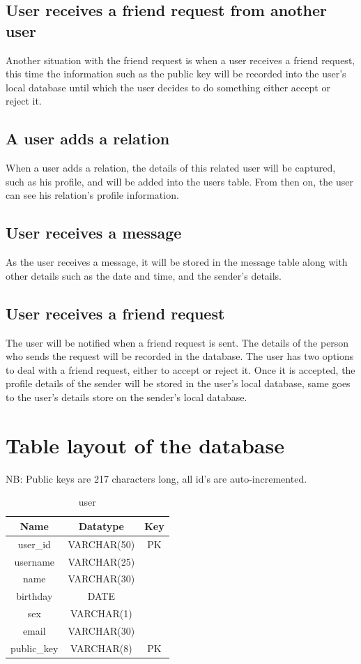 \subsection{User receives a friend request from another user}
Another situation with the friend request is when a user receives a friend 
request, this time the information such as the public key will be recorded 
into the user's local database until which the user decides to do something 
either accept or reject it.

\subsection{A user adds a relation}
When a user adds a relation, the details of this related user will be captured, 
such as his profile, and will be added into the users table. From then on, the 
user can see his relation's profile information. 

\subsection{User receives a message} 
As the user receives a message, it will be stored in the message table along 
with other details such as the date and time, and the sender's details.

\subsection{User receives a friend request}
The user will be notified when a friend request is sent. The details of the 
person who sends the request will be recorded in the database. The user has 
two options to deal with a friend request, either to accept or reject it. Once 
it is accepted, the profile details of the sender will be stored in the user's 
local database, same goes to the user's details store on the sender's local 
database.

\clearpage

\section{Table layout of the database}
NB: Public keys are 217 characters long, all id's are auto-incremented.

\begin{table}[!ht]
\caption{user}
\centering
\begin{tabular}{c c c}
\hline\hline
Name               & Datatype    & Key \\
\hline
user\_id           & VARCHAR(50)  & PK \\  %
username           & VARCHAR(25)  &    \\
name               & VARCHAR(30)  &    \\
birthday           & DATE         &    \\
sex                & VARCHAR(1)   &    \\
email              & VARCHAR(30)  &    \\
public\_key        & VARCHAR(8)   & PK \\
\hline
\end{tabular}
\label{table:nonlin}
\end{table}

